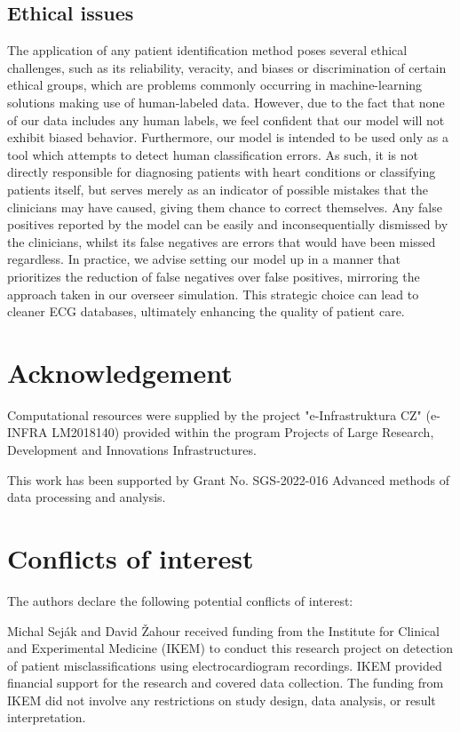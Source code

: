 \documentclass[preprint,12pt]{elsarticle}
\begin{document}
\subsection{Ethical issues}
The application of any patient identification method poses several ethical challenges, such as its reliability, veracity, and biases or discrimination of certain ethical groups, which are problems commonly occurring in machine-learning solutions making use of human-labeled data. However, due to the fact that none of our data includes any human labels, we feel confident that our model will not exhibit biased behavior. Furthermore, our model is intended to be used only as a tool which attempts to detect human classification errors. As such, it is not directly responsible for diagnosing patients with heart conditions or classifying patients itself, but serves merely as an indicator of possible mistakes that the clinicians may have caused, giving them chance to correct themselves. Any false positives reported by the model can be easily and inconsequentially dismissed by the clinicians, whilst its false negatives are errors that would have been missed regardless. In practice, we advise setting our model up in a manner that prioritizes the reduction of false negatives over false positives, mirroring the approach taken in our overseer simulation. This strategic choice can lead to cleaner ECG databases, ultimately enhancing the quality of patient care.


\section*{Acknowledgement}
\noindent Computational resources were supplied by the project "e-Infrastruktura CZ" (e-INFRA LM2018140) provided within the program Projects of Large Research, Development and Innovations Infrastructures.

\vspace{0.9em}

\noindent This work has been supported by Grant No. SGS-2022-016 Advanced methods of data processing and analysis.

\section*{Conflicts of interest}

\noindent The authors declare the following potential conflicts of interest:

Michal Seják and David Žahour received funding from the Institute for Clinical and Experimental Medicine (IKEM) to conduct this research project on detection of patient misclassifications using electrocardiogram recordings.
IKEM provided financial support for the research and covered data collection. The funding from IKEM did not involve any restrictions on study design, data analysis, or result interpretation.
\end{document}
